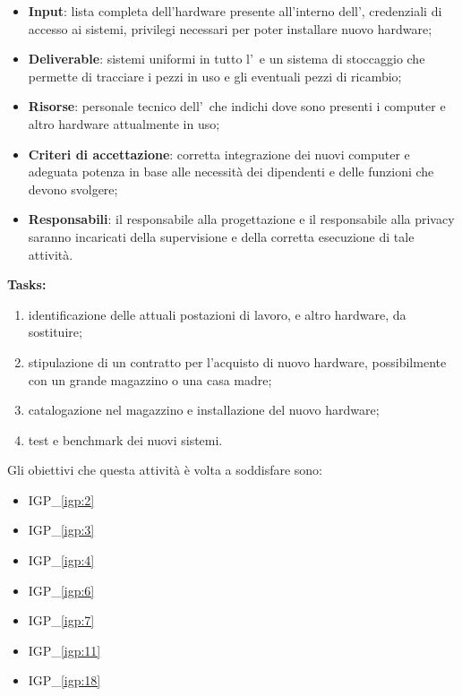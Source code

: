 		\begin{itemize}[noitemsep]
			\renewcommand\labelitemi{--}
			\item \textbf{Input}: lista completa dell'hardware presente all'interno dell'\istituto, credenziali di accesso ai sistemi, privilegi necessari per poter installare nuovo hardware;
			\item \textbf{Deliverable}: sistemi uniformi in tutto l'\istituto~e un sistema di stoccaggio che permette di tracciare i pezzi in uso e gli eventuali pezzi di ricambio;
			\item \textbf{Risorse}: personale tecnico dell'\istituto~che indichi dove sono presenti i computer e altro hardware attualmente in uso;
			\item \textbf{Criteri di accettazione}: corretta integrazione dei nuovi computer e adeguata potenza in base alle necessità dei dipendenti e delle funzioni che devono svolgere;
			\item \textbf{Responsabili}: il responsabile alla progettazione e il responsabile alla privacy saranno incaricati della supervisione e della corretta esecuzione di tale attività.
		\end{itemize}

		\newpage		
		\textbf{Tasks:}
		\begin{enumerate}[noitemsep]
			\item identificazione delle attuali postazioni di lavoro, e altro hardware, da sostituire;
			\item stipulazione di un contratto per l'acquisto di nuovo hardware, possibilmente con un grande magazzino o una casa madre;
			\item catalogazione nel magazzino e installazione del nuovo hardware;
			\item test e benchmark dei nuovi sistemi.
		\end{enumerate}

		Gli obiettivi che questa attività è volta a soddisfare sono:
		\begin{itemize}[noitemsep]
			\renewcommand\labelitemi{--}
			\item {\color{pantone}IGP\_\ref{igp:2}}
			\item {\color{pantone}IGP\_\ref{igp:3}}
			\item {\color{pantone}IGP\_\ref{igp:4}}
			\item {\color{pantone}IGP\_\ref{igp:6}}
			\item {\color{pantone}IGP\_\ref{igp:7}}
			\item {\color{pantone}IGP\_\ref{igp:11}}
			\item {\color{pantone}IGP\_\ref{igp:18}}
		\end{itemize}

